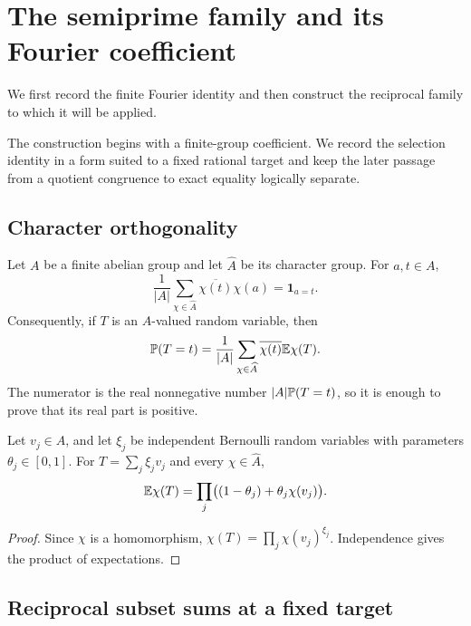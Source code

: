 \section{The semiprime family and its Fourier coefficient}
\label{sec:family-fourier}

We first record the finite Fourier identity and then construct the reciprocal family to which it will be applied.

\label{sec:fourier-selection}

The construction begins with a finite-group coefficient. We record the selection identity in a form suited to a fixed rational target and keep the later passage from a quotient congruence to exact equality logically separate.

\subsection{Character orthogonality}

Let $A$ be a finite abelian group and let $\widehat A$ be its character group. For $a,t\in A$,
\[
 \frac1{|A|}\sum_{\chi\in\widehat A}\overline{\chi(t)}\chi(a)=\mathbf 1_{a=t}.
\]
Consequently, if $T$ is an $A$-valued random variable, then
\begin{equation}
\label{eq:finite-fourier-coefficient}
 \mathbb{P}(T=t)=\frac1{|A|}\sum_{\chi\in\widehat A}\overline{\chi(t)}\mathbb{E}\chi(T).
\end{equation}
The numerator is the real nonnegative number $|A|\mathbb{P}(T=t)$, so it is enough to prove that its real part is positive.

\begin{lemma}
\label{lem:independent-product}
Let $v_j\in A$, and let $\xi_j$ be independent Bernoulli random variables with parameters $\theta_j\in[0,1]$. For $T=\sum_j\xi_jv_j$ and every $\chi\in\widehat A$,
\[
 \mathbb{E}\chi(T)=\prod_j\bigl((1-\theta_j)+\theta_j\chi(v_j)\bigr).
\]
\end{lemma}
\begin{proof}
Since $\chi$ is a homomorphism, $\chi(T)=\prod_j\chi(v_j)^{\xi_j}$. Independence gives the product of expectations.
\end{proof}

\subsection{Reciprocal subset sums at a fixed target}

